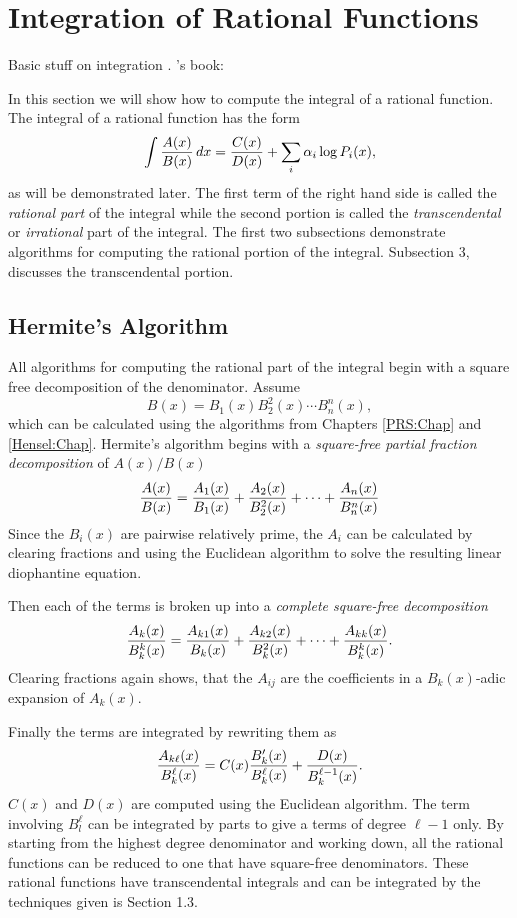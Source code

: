 \chapter{Integration of Rational Functions}
\label{Ration:Int:Chap}

Basic stuff on integration \cite{Rosenlicht1972-cd,Mead1961-jm,Ritt1923-iy}.  {\Ritt}'s
book: \cite{Ritt1948-xp}  


In this section we will show how to compute the integral of a rational
function.  The integral of a rational function has the form
\[
\int {A(x) \over B(x)} \, dx 
  = {C(x) \over D(x)} + \sum_i \alpha_i \log P_i(x),
\]
as will be demonstrated later.  The first term of the right hand side is
called the {\em rational part} of the integral while the second portion is
called the {\em transcendental} or {\em irrational} part of the integral.
The first two subsections demonstrate algorithms for computing the rational
portion of the integral.  Subsection 3,  discusses the transcendental
portion. 

\section{Hermite's Algorithm}

All algorithms for computing the rational part of the integral begin with a
square free decomposition of the denominator.  Assume
\[
B(x) = B_1(x) B_2^2(x) \cdots B_n^n(x),
\]
which can be calculated using the algorithms from Chapters
\ref{PRS:Chap} and \ref{Hensel:Chap}.  Hermite's
algorithm begins with a {\em square-free partial fraction decomposition} of
$A(x)/B(x)$
\[
{A(x) \over B(x)} = 
{A_1(x) \over B_1(x)} + {A_2(x) \over B_2^2(x)} + \cdots +
{A_n(x) \over B_n^n(x)}
\]
Since the $B_i(x)$ are pairwise relatively prime, the $A_i$ can be
calculated by clearing fractions and using the Euclidean algorithm to
solve the resulting linear diophantine equation.

Then each of the terms is broken up into a {\em complete square-free
decomposition}
\[
{A_k(x) \over B_k^k(x)} = {A_{k1}(x) \over B_k(x)} +
{A_{k2}(x) \over B_k^2(x)} + \cdots + {A_{kk}(x) \over B_k^k(x)}.
\]
Clearing fractions again shows, that the $A_{ij}$ are the coefficients in a
$B_k(x)$-adic expansion of $A_k(x)$.

Finally the terms are integrated by rewriting them as 
\begin{equation} \label{Int:PF:Eq}
{A_{k\ell}(x) \over B_k^{\ell}(x)} = 
C(x) {B_k'(x) \over B_k^{\ell}(x)} +
{D(x) \over B_k^{\ell-1}(x)}.
\end{equation}
$C(x)$ and $D(x)$ are computed using the Euclidean algorithm.  The term
involving $B_l^{\ell}$ can be integrated by parts to give a terms of
degree $\ell - 1$ only.  By starting from the highest degree denominator
and working down, all the rational functions can be reduced to one that have
square-free denominators.  These rational functions have transcendental
integrals and can be integrated by the techniques given is Section 1.3.

